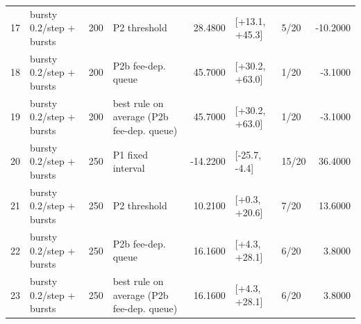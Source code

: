 \begin{tabular}{llrlrllr}
17 & bursty 0.2/step + bursts & 200 & P2 threshold & 28.4800 & [+13.1, +45.3] & 5/20 & -10.2000 \\
18 & bursty 0.2/step + bursts & 200 & P2b fee-dep. queue & 45.7000 & [+30.2, +63.0] & 1/20 & -3.1000 \\
19 & bursty 0.2/step + bursts & 200 & best rule on average (P2b fee-dep. queue) & 45.7000 & [+30.2, +63.0] & 1/20 & -3.1000 \\
20 & bursty 0.2/step + bursts & 250 & P1 fixed interval & -14.2200 & [-25.7, -4.4] & 15/20 & 36.4000 \\
21 & bursty 0.2/step + bursts & 250 & P2 threshold & 10.2100 & [+0.3, +20.6] & 7/20 & 13.6000 \\
22 & bursty 0.2/step + bursts & 250 & P2b fee-dep. queue & 16.1600 & [+4.3, +28.1] & 6/20 & 3.8000 \\
23 & bursty 0.2/step + bursts & 250 & best rule on average (P2b fee-dep. queue) & 16.1600 & [+4.3, +28.1] & 6/20 & 3.8000 \\
\bottomrule
\end{tabular}
